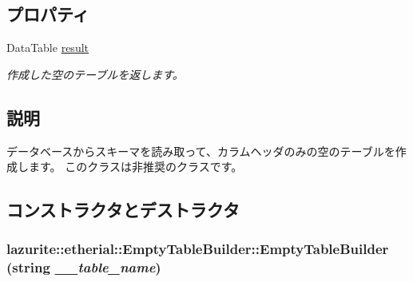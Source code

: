 \subsection*{プロパティ}
\begin{DoxyCompactItemize}
\item 
DataTable \hyperlink{classlazurite_1_1etherial_1_1_empty_table_builder_a0e1fd9342c520bb875abb8054ff1b50c}{result}
\begin{DoxyCompactList}\small\item\em 作成した空のテーブルを返します。 \item\end{DoxyCompactList}\end{DoxyCompactItemize}


\subsection{説明}
データベースからスキーマを読み取って、カラムヘッダのみの空のテーブルを作成します。 このクラスは非推奨のクラスです。 

\subsection{コンストラクタとデストラクタ}
\hypertarget{classlazurite_1_1etherial_1_1_empty_table_builder_ac3007285611c6626e9b92fb072bfb825}{
\subsubsection[{EmptyTableBuilder}]{\setlength{\rightskip}{0pt plus 5cm}lazurite::etherial::EmptyTableBuilder::EmptyTableBuilder (string {\em \_\-\_\-table\_\-name})}}
\label{classlazurite_1_1etherial_1_1_empty_table_builder_ac3007285611c6626e9b92fb072bfb825}


